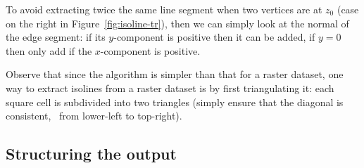 To avoid extracting twice the same line segment when two vertices are at $z_0$ (case on the right in Figure~\ref{fig:isoline-tr}), then we can simply look at the normal of the edge segment: if its $y$-component is positive then it can be added, if $y=0$ then only add if the $x$-component is positive.

Observe that since the algorithm is simpler than that for a raster dataset, one way to extract isolines from a raster dataset is by first triangulating it: each square cell is subdivided into two triangles (simply ensure that the diagonal is consistent, \eg\ from lower-left to top-right).








\subsection{Structuring the output}%
\label{sec:structuring}

